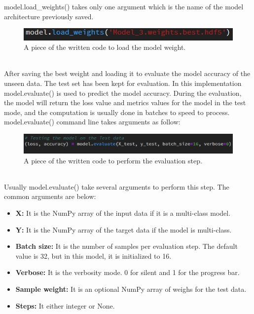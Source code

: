 model.load\_weights() takes only one argument which is the name of the model architecture previously saved. 
\begin{figure}[ht]
    \centering
    \includegraphics{Figures/loadweight}
    \decoRule
    \caption [A piece of the written code to load the model weight.]{A piece of the written code to load the model weight.}
    \label{fig:la}
    \end{figure}\hfill \\
 After saving the best weight and loading it to evaluate the model accuracy of the unseen data. The test set has been kept for evaluation. 
In this implementation model.evaluate() is used to predict the model accuracy. During the evaluation, the model will return the loss value and metrics values for the model in the test mode, and the computation is usually done in batches to speed to process.
model.evaluate() command line takes arguments as follow:
\begin{figure}[ht]
    \centering
    \includegraphics{Figures/ev}
    \decoRule
    \caption [A piece of the written code to perform the evaluation step.]{A piece of the written code to perform the evaluation step.}
    \label{fig:la}
    \end{figure}\hfill \\
    
Usually model.evaluate() take several arguments to perform this step. The common arguments are below:\\
 \noindent{}
 \begin{itemize}
     \item \textbf{X:} It is the NumPy array of the input data if it is a multi-class model.
     \item \textbf{Y:} It is the NumPy array of the target data if the model is multi-class.
     \item \textbf{Batch size:} It is the number of samples per evaluation step. The default value is 32, but in this model, it is initialized to 16.
     \item \textbf{Verbose:} It is the verbosity mode. 0 for silent and 1 for the progress bar.
     \item \textbf{Sample weight:} It is an optional NumPy array of weighs for the test data.
     \item \textbf{Steps:} It either integer or None. 
     
 \end{itemize}
